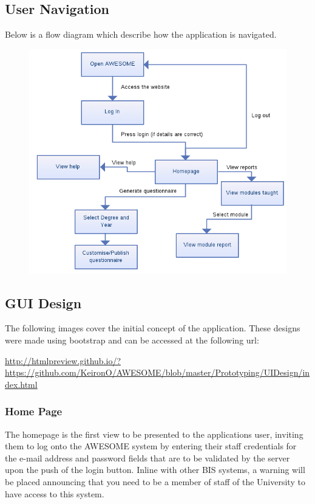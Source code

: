 \documentclass[11pt,a4paper]{article}
\begin{document}
\subsection{User Navigation}

Below is a flow diagram which describe how the application is navigated.

\begin{figure}[h]
\centering
\includegraphics[width=0.85\linewidth]{images/flow/flow.png}
\end{figure}

\clearpage

\subsection{GUI Design}

The following images cover the initial concept of the application. These designs were made using bootstrap and can be accessed at the following url:

\url{http://htmlpreview.github.io/?https://github.com/KeironO/AWESOME/blob/master/Prototyping/UIDesign/index.html}

\subsubsection{Home Page}
The homepage is the first view to be presented to the applications user, inviting them to log onto the AWESOME system by entering their staff credentials for the e-mail address and password fields that are to be validated by the server upon the push of the login button. Inline with other BIS systems, a warning will be placed announcing that you need to be a member of staff of the University to have access to this system.
\end{document}

